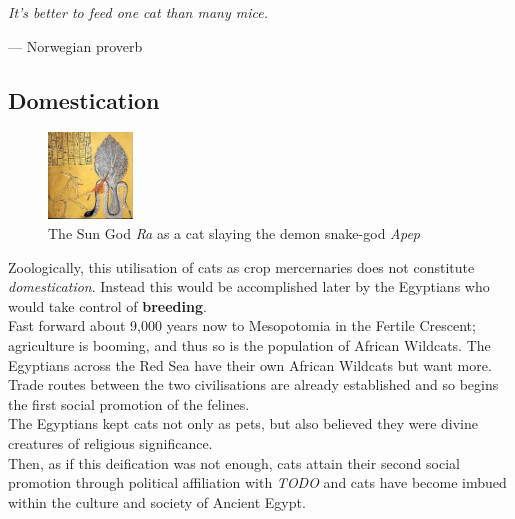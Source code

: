 \documentclass{article}
\begin{document}
\begin{flushright}
\begin{minipage}{8cm}
    \begin{flushleft}
        \emph{It's better to feed one cat than many mice.}
    \end{flushleft}
    \begin{flushright}--- Norwegian proverb\end{flushright}
\end{minipage}
\end{flushright}

\subsection*{Domestication}

\begin{figure}
    \centering
    \includegraphics[width=0.20\textwidth]{img/apep-cat.png}
    \caption{The Sun God \emph{Ra} as a cat slaying the demon snake-god \emph{Apep}}
\end{figure}

Zoologically, this utilisation of cats as crop mercernaries does not constitute \emph{domestication}. Instead this would be accomplished later by the Egyptians who would take control of \textbf{breeding}.\\

Fast forward about 9,000 years now to Mesopotomia in the Fertile Crescent; agriculture is booming, and thus so is the population of African Wildcats. The Egyptians across the Red Sea have their own African Wildcats but want more. Trade routes between the two civilisations are already established and so begins the first social promotion of the \gls{feline}s.\\

The Egyptians kept cats not only as pets, but also believed they were divine creatures of religious significance.\\

Then, as if this deification was not enough, cats attain their second social promotion through political affiliation with \emph{TODO} and cats have become imbued within the culture and society of Ancient Egypt.
\end{document}
